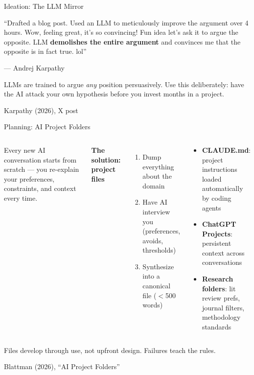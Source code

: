 \documentclass[aspectratio=169, 11pt]{beamer}
\newcommand{\emphgold}[1]{\alert{\textbf{#1}}}
\newcommand{\sourceref}[1]{\vspace{0.15cm}\hfill{\tiny\textcolor{medgray}{#1}}}
\begin{document}
\begin{frame}[shrink=11]{Ideation: The LLM Mirror}
\vfill
\begin{bigquote}
\large
``Drafted a blog post. Used an LLM to meticulously improve the argument over 4 hours. Wow, feeling great, it's so convincing! Fun idea let's ask it to argue the opposite. LLM \emphgold{demolishes the entire argument} and convinces me that the opposite is in fact true. lol''
\end{bigquote}
\vspace{0.5cm}
\hfill\textcolor{medgray}{\normalsize --- Andrej Karpathy}
\vspace{0.5cm}
\begin{keyinsight}
LLMs are trained to argue \emph{any} position persuasively. Use this deliberately: have the AI attack your own hypothesis before you invest months in a project.
\end{keyinsight}
\vfill
\sourceref{Karpathy (2026), X post}
\end{frame}

\begin{frame}[shrink=19]{Planning: AI Project Folders}
\begin{columns}[T]
\begin{keyinsight}
Every new AI conversation starts from scratch --- you re-explain your preferences, constraints, and context every time.
\end{keyinsight}
\vspace{0.3cm}
\textbf{The solution: project files}
\begin{enumerate}
  \item Dump everything about the domain
  \item Have AI interview you (preferences, avoids, thresholds)
  \item Synthesize into a canonical file ($<$500 words)
\end{enumerate}

\begin{keyinsight}[Examples]
\begin{itemize}
  \item \textbf{CLAUDE.md}: project instructions loaded automatically by coding agents
  \item \textbf{ChatGPT Projects}: persistent context across conversations
  \item \textbf{Research folders}: lit review prefs, journal filters, methodology standards
\end{itemize}
\end{keyinsight}
\end{columns}
\vspace{0.3cm}
\begin{center}
\small Files develop through use, not upfront design. Failures teach the rules.
\end{center}
\sourceref{Blattman (2026), ``AI Project Folders''}
\end{frame}
\end{document}
